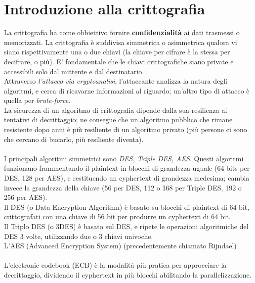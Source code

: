 \documentclass[11pt, oneside]{article}   	%
\begin{document}
\section*{Introduzione alla crittografia}
La crittografia ha come obbiettivo fornire \textbf{confidenzialità} ai dati trasmessi o memorizzati. La crittografia è suddivisa simmetrica o asimmetrica qualora vi siano rispettivamente una o due chiavi (la chiave per cifrare è la stessa per decifrare, o più). E' fondamentale che le chiavi crittografiche siano private e accessibili solo dal mittente e dal destinatario.\\
Attraverso \emph{l'attacco via cryptoanalisi}, l'attaccante analizza la natura degli algoritmi, e cerca di ricavarne informazioni al riguardo; un'altro tipo di attacco è quella per \emph{brute-force}.\\
La sicurezza di un algoritmo di crittografia dipende dalla sua resilienza ai tentativi di decrittaggio; ne consegue che un algoritmo pubblico che rimane resistente dopo anni è più resiliente di un algoritmo privato (più persone ci sono che cercano di bucarlo, più resiliente diventa). \\\\I principali algoritmi simmetrici sono \emph{DES, Triple DES, AES}. Questi algoritmi funzionano frammentando il plaintext in blocchi di grandezza uguale (64 bits per DES, 128 per AES), e restituendo un cyphertext di grandezza medesima; cambia invece la grandezza della chiave (56 per DES, 112 o 168 per Triple DES, 192 o 256 per AES).\\
Il DES (o Data Encryption Algorithm) è basato su blocchi di plaintext di 64 bit, crittografati con una chiave di 56 bit per produrre un cyphertext di 64 bit.\\
Il Triplo DES (o 3DES) è basato sul DES, e ripete le operazioni algoritmiche del DES 3 volte, utilizzando due o 3 chiavi univoche.\\
L'AES (Advanced Encryption System) (precedentemente chiamato Rijndael) \\\\
L'electronic codebook (ECB) è la modalità più pratica per approcciare la decrittaggio, dividendo il cyphertext in più blocchi abilitando la parallelizzazione. 
\end{document}
